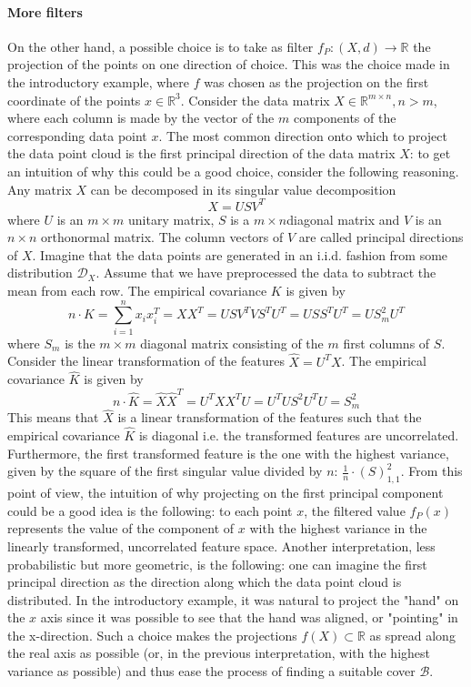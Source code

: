 \paragraph{More filters}
On the other hand, a possible choice is to take as filter $f_P: (X,d)\rightarrow\mathbb{R}$ the projection of the points on one direction of choice. This was the choice made in the introductory example, where $f$ was chosen as the projection on the first coordinate of the points $x\in\mathbb R^3$. Consider the data matrix $X\in\mathbb{R}^{m\times n}, n>m$, where each column is made by the vector of the $m$ components of the corresponding data point $x$. The most common direction onto which to project the data point cloud is the first principal direction of the data matrix $X$: to get an intuition of why this could be a good choice, consider the following reasoning. \newline 
Any matrix $X$ can be decomposed in its singular value decomposition $$X=USV^T$$ where $U$ is an $m \times m$ unitary matrix, $S$ is a $m \times n $diagonal matrix and $V$ is an $n\times n$ orthonormal matrix. The column vectors of $V$ are called principal directions of $X$. Imagine that the data points are generated in an i.i.d. fashion from some distribution $\mathcal{D}_X$. Assume that we have preprocessed the data to subtract the mean from each row. The empirical covariance $K$ is given by 
$$n\cdot K=\sum_{i=1}^{n}x_ix_i^T = XX^T=USV^TVS^TU^T=USS^TU^T=US_m^2U^T$$ where $S_m$ is the $m\times m$ diagonal matrix consisting of the $m$ first columns of $S$. Consider the linear transformation of the features $\hat{X}=U^TX$. The empirical covariance $\hat{K}$ is given by 
$$n\cdot \hat{K}=\hat{X}\hat{X}^T=U^TXX^TU=U^TUS^2U^TU=S_m^2$$
This means that $\hat{X}$ is a linear transformation of the features such that the empirical covariance $\hat{K}$ is diagonal i.e. the transformed features are uncorrelated. Furthermore, the first transformed feature is the one with the highest variance, given by the square of the first singular value divided by $n$: $\frac{1}{n}\cdot(S)_{1,1}^2$. From this point of view, the intuition of why projecting on the first principal component could be a good idea is the following: to each point $x$, the filtered value $f_P(x)$ represents the value of the component of $x$ with the highest variance in the linearly transformed, uncorrelated feature space.\newline
Another interpretation, less probabilistic but more geometric, is the following: one can imagine the first principal direction as the direction along which the data point cloud is distributed. In the introductory example, it was natural to project the "hand" on the $x$ axis since it was possible to see that the hand was aligned, or "pointing" in the x-direction. Such a choice makes the projections $f(X)\subset\mathbb R$ as spread along the real axis as possible (or, in the previous interpretation, with the highest variance as possible) and thus ease the process of finding a suitable cover $\mathcal{B}$.\newline
